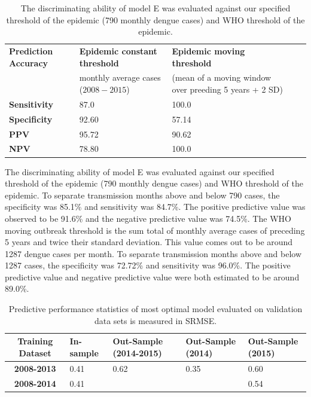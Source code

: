 \documentclass{bmcart}
\begin{document}
\begin{table}
	\centering
	\label{my-label}
	\begin{tabular}{|l|p{4.0cm}|p{4.0cm}|ll}
		\hline
		\textbf{Prediction Accuracy} & \textbf{Epidemic constant threshold}  & \textbf{Epidemic moving threshold} \\
	                                 & monthly average cases ($2008-2015$)  & (mean of a moving window over preeding 5 years + 2 SD) \\  \cline{1-3}
		\textbf{Sensitivity} & 87.0  & 100.0  \\ 
	    \textbf{Specificity} & 92.60 &  57.14  \\ 
		\textbf{PPV} & 95.72 &  90.62         \\ 
		\textbf{NPV} & 78.80  &  100.0        \\\cline{1-3}
	\end{tabular}
	\caption{The discriminating ability of model E was evaluated against our specified threshold of the epidemic (790 monthly dengue cases) and WHO threshold  of the epidemic.}
\end{table}

The discriminating ability of model E was evaluated against our specified threshold of the epidemic (790 monthly dengue cases) and WHO threshold of the epidemic. To separate transmission months above and below 790 cases, the specificity was 85.1\% and sensitivity was 84.7\%. The positive predictive value was observed to be 91.6\% and the negative predictive value was 74.5\%. The WHO moving outbreak threshold \cite{world2009dengue} is the sum total of monthly average cases of preceding 5 years and twice their standard deviation. This value comes out to be around 1287 dengue cases per month. To separate transmission months above and below 1287 cases, the specificity was 72.72\% and sensitivity was 96.0\%. The positive predictive value and negative predictive value were both estimated to be around 89.0\%.





\begin{table}[H]
	\centering
	\begin{tabular}{|cp{1.5cm}p{1.5cm}p{1.5cm}p{1.5cm}|}
		\hline
		\textbf{Training Dataset} & \textbf{In-sample} &  \textbf{Out-Sample} (2014-2015) & \textbf{Out-Sample} (2014) & \textbf{Out-Sample} (2015) \\ 
		\hline
		\textbf{2008-2013} & 0.41 &  0.62 &  0.35 & 0.60 \\ 
		\textbf{2008-2014} & 0.41 &       &       & 0.54 \\ 
		\hline
	\end{tabular}
	\caption{Predictive performance statistics of most optimal model evaluated on validation data sets is measured in SRMSE.}
	\label{tab:resultsOfValidation}
\end{table}
\end{document}
